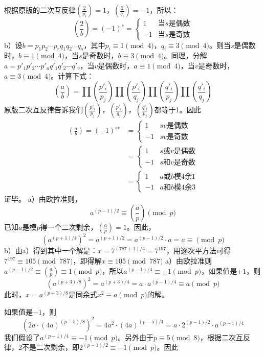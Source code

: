 根据原版的二次互反律$\left(\frac{2}{p_i}\right)=1$，$\left(\frac{2}{q_i}\right)=-1$，所以：
\[\left(\frac{2}{b}\right)=(-1)^s=
\begin{cases}
1 & \text{当$s$是偶数}\\
-1 & \text{当$s$是奇数}
\end{cases}\]
b）\proof 设$b=p_1p_2\cdots p_rq_1q_2\cdots q_s$，其中$p_i\equiv1\pmod4$，$q_i\equiv3\pmod4$。则当$s$是偶数时，$b\equiv1\pmod4$，当$s$是奇数时，$b\equiv3\pmod4$。同理，分解$a=p'_1p'_2\cdots p'_uq'_1q'_2\cdots q'_v$，当$v$是偶数时，$a\equiv1\pmod4$，当$v$是奇数时，$a\equiv3\pmod4$。计算下式：
\[\left(\frac{a}{b}\right)=\prod\left(\frac{p'_i}{p_j}\right)\prod\left(\frac{p'_i}{q_j}\right)\prod\left(\frac{q'_i}{p_j}\right)\prod\left(\frac{q'_i}{q_j}\right)\]
原版二次互反律告诉我们$\left(\frac{p'_i}{p_j}\right)$，$\left(\frac{p'_i}{q_j}\right)$，$\left(\frac{q'_i}{p_j}\right)$都等于1。因此
\begin{align*}
\left(\frac{a}{b}\right)=(-1)^{sv}&=
\begin{cases}
1 & \text{$sv$是偶数}\\
-1 & \text{$sv$是奇数}
\end{cases} \\
&=\begin{cases}
1 & \text{$s$或$v$是偶数}\\
-1 & \text{$s$和$v$是奇数}
\end{cases} \\
&=\begin{cases}
1 & \text{$a$或$b$模4余1}\\
-1 & \text{$a$和$b$模4余3}
\end{cases}
\end{align*}
证毕。
%
\exercise a）由欧拉准则，
\[a^{(p-1)/2}\equiv\left(\frac{a}{p}\right)\pmod p\]
已知$a$是模$p$得一个二次剩余，$\left(\frac{a}{p}\right)=1$。因此，
\[\left(a^{(p+1)/4}\right)^2=a^{(p+1)/2}=a^{(p-1)/2}\cdot a=a\equiv\pmod p\]
b）由a）得到其中一个解是：$x = 7^{(787+1)/4} = 7^{197}$，用逐次平方法可得$7^{197}\equiv 105\pmod{787}$，即得解$x\equiv 105\pmod{787}$
%
\exercise a）\proof 由欧拉准则$a^{(p-1)/2}\equiv\left(\frac{a}{p}\right)\equiv1\pmod p$，所以$a^{(p-1)/4}\equiv\pm1\pmod p$，如果值是$+1$，则
\[\left(a^{(p+3)/8}\right)^2=a^{(p+3)/4}=a\cdot a^{(p-1)/4}\equiv a\pmod p\]
此时，$x=a^{(p+3)/8}$是同余式$x^2\equiv a\pmod p$的解。\par
如果值是$-1$，则
\[\left(2a\cdot (4a)^{(p-5)/8}\right)^2=4a^2\cdot (4a)^{(p-5)/4}=a\cdot 2^{(p-1)/2}\cdot a^{(p-1)/4}\]
我们假设了$a^{(p-1)/4}\equiv-1\pmod p$。另外由于$p\equiv5\pmod 8$，根据二次互反律，2不是二次剩余，即$2^{(p-1)/2}\equiv-1\pmod p$。因此
